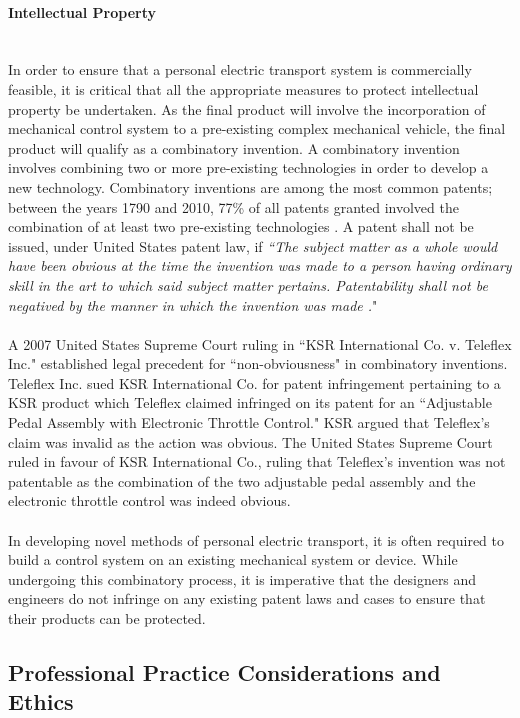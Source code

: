 \paragraph{Intellectual Property}\mbox{}\\
In order to ensure that a personal electric transport system is commercially feasible, it is critical that all the appropriate measures to protect intellectual property be undertaken. 
As the final product will involve the incorporation of mechanical control system to a pre-existing complex mechanical vehicle, the final product will qualify as a combinatory invention. 
A combinatory invention involves combining two or more pre-existing technologies in order to develop a new technology. 
Combinatory inventions are among the most common patents; between the years 1790 and 2010, 77\% of all patents granted involved the combination of at least two pre-existing technologies \cite{comblaw}.
A patent shall not be issued, under United States patent law, if \emph{``The subject matter as a whole would have been obvious at the time the invention was made to a person having ordinary skill in the art to which said subject matter pertains. 
Patentability shall not be negatived by the manner in which the invention was made \cite{NonObv}.}"  
\\
\\
A 2007 United States Supreme Court ruling in ``KSR International Co. v. Teleflex Inc." established legal precedent for “non-obviousness" in combinatory inventions. 
Teleflex Inc. sued KSR International Co. for patent infringement pertaining to a KSR product which Teleflex claimed infringed on its patent for an ``Adjustable Pedal Assembly with Electronic Throttle Control."
KSR argued that Teleflex's claim was invalid as the action was obvious. 
The United States Supreme Court ruled in favour of KSR International Co.,  
ruling that Teleflex's invention was not patentable as the combination of the two adjustable pedal assembly and the electronic throttle control was indeed obvious. 
\\
\\
In developing novel methods of personal electric transport, it is often required to build a control system on an existing mechanical system or device. While undergoing this combinatory process, it is imperative that the designers and engineers do not infringe on any existing patent laws and cases to ensure that their products can be protected.


\subsection{Professional Practice Considerations and Ethics}

